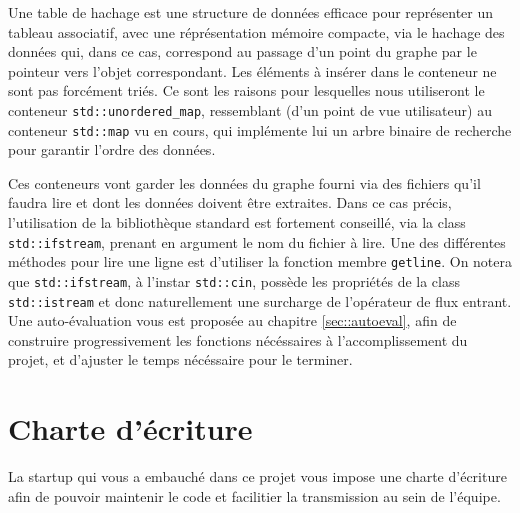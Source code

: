 \documentclass[9pts]{article}
\begin{document}
Une table de hachage est une structure de données efficace pour représenter un tableau associatif, avec une réprésentation mémoire compacte, via le hachage des données qui, dans ce cas, correspond au passage d'un point du graphe par le pointeur vers l'objet correspondant. Les éléments à insérer dans le conteneur ne sont pas forcément triés. Ce sont les raisons pour lesquelles nous utiliseront le conteneur \texttt{std::unordered\_map}, ressemblant (d'un point de vue utilisateur) au conteneur \texttt{std::map} vu en cours, qui implémente lui un arbre binaire de recherche pour garantir l'ordre des données.%

Ces conteneurs vont garder les données du graphe fourni via des fichiers qu'il faudra lire et dont les données doivent être extraites.
Dans ce cas précis, l'utilisation de la bibliothèque standard est fortement conseillé, via la class \texttt{std::ifstream}, prenant en argument le nom du fichier à lire. Une des différentes méthodes pour lire une ligne est d'utiliser la fonction membre \texttt{getline}. On notera que \texttt{std::ifstream}, à l'instar \texttt{std::cin}, possède les propriétés de la class \texttt{std::istream} et donc naturellement une surcharge de l'opérateur de flux entrant.\\

Une auto-évaluation vous est proposée au chapitre \ref{sec::autoeval}, afin de construire progressivement les fonctions nécéssaires à l'accomplissement du projet, et d'ajuster le temps nécéssaire pour le terminer.

\section{Charte d'écriture}
\label{sec::charte}
La startup qui vous a embauché dans ce projet vous impose une charte d'écriture afin de pouvoir maintenir le code et facilitier la transmission au sein de l'équipe.
\end{document}
